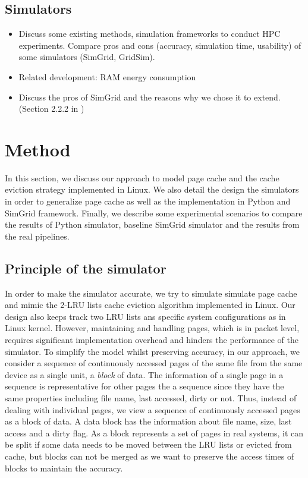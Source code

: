 \documentclass[conference]{IEEEtran}
\begin{document}
		\subsection{Simulators}
			\begin{itemize}
				\item Discuss some existing methods, simulation frameworks to conduct HPC experiments. Compare pros and cons (accuracy, simulation time, usability) of some simulators (SimGrid, GridSim).
				\item Related development: RAM energy consumption \cite{gill2019} \cite{ouarnoughi2017} 
				\item Discuss the pros of SimGrid and the reasons why we chose it to extend. (Section 2.2.2 in \cite{casanova2014})
			\end{itemize}
			
	\section{Method}
		In this section, we discuss our approach to model page cache and the cache eviction strategy implemented in Linux. We also detail the design the simulators in order to generalize page cache as well as the implementation in Python and SimGrid framework. Finally, we describe some experimental scenarios to compare the results of Python simulator, baseline SimGrid simulator and the results from the real pipelines.
		\subsection{Principle of the simulator}
	
			In order to make the simulator accurate, we try to simulate simulate page cache and mimic the 2-LRU lists cache eviction algorithm implemented in Linux. Our design also keeps track two LRU lists ans specific system configurations as in Linux kernel. However, maintaining and handling pages, which is in packet level, requires significant implementation overhead and hinders the performance of the simulator. To simplify the model whilst preserving accuracy, in our approach, we consider a sequence of continuously accessed pages of the same file from the same device as a single unit, a \textit{block} of data. The information of a single page in a sequence is representative for other pages the a sequence since they have the same properties including file name, last accessed, dirty or not. Thus, instead of dealing with individual pages, we view a sequence of continuously accessed pages as a block of data. A data block has the information about file name, size, last access and a dirty flag. As a block represents a set of pages in real systems, it can be split if some data needs to be moved between the LRU lists or evicted from cache, but blocks can not be merged as we want to preserve the access times of blocks to maintain the accuracy. 
			
\end{document}
